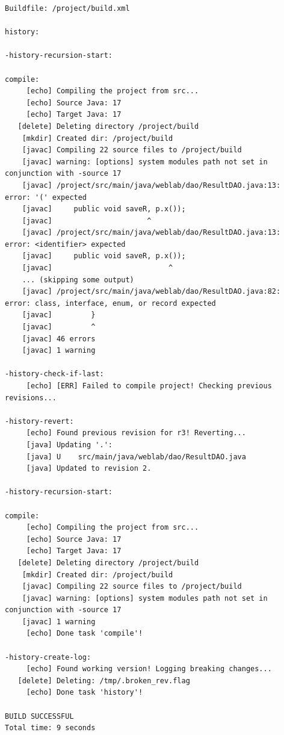 \begin{lstlisting}[caption={Лог цели \texttt{history} --- есть ошибки},language={},captionpos=b]
Buildfile: /project/build.xml

history:

-history-recursion-start:

compile:
     [echo] Compiling the project from src...
     [echo] Source Java: 17
     [echo] Target Java: 17
   [delete] Deleting directory /project/build
    [mkdir] Created dir: /project/build
    [javac] Compiling 22 source files to /project/build
    [javac] warning: [options] system modules path not set in conjunction with -source 17
    [javac] /project/src/main/java/weblab/dao/ResultDAO.java:13: error: '(' expected
    [javac]     public void saveR, p.x());
    [javac]                      ^
    [javac] /project/src/main/java/weblab/dao/ResultDAO.java:13: error: <identifier> expected
    [javac]     public void saveR, p.x());
    [javac]                           ^
    ... (skipping some output)
    [javac] /project/src/main/java/weblab/dao/ResultDAO.java:82: error: class, interface, enum, or record expected
    [javac]         }
    [javac]         ^
    [javac] 46 errors
    [javac] 1 warning

-history-check-if-last:
     [echo] [ERR] Failed to compile project! Checking previous revisions...

-history-revert:
     [echo] Found previous revision for r3! Reverting...
     [java] Updating '.':
     [java] U    src/main/java/weblab/dao/ResultDAO.java
     [java] Updated to revision 2.

-history-recursion-start:

compile:
     [echo] Compiling the project from src...
     [echo] Source Java: 17
     [echo] Target Java: 17
   [delete] Deleting directory /project/build
    [mkdir] Created dir: /project/build
    [javac] Compiling 22 source files to /project/build
    [javac] warning: [options] system modules path not set in conjunction with -source 17
    [javac] 1 warning
     [echo] Done task 'compile'!

-history-create-log:
     [echo] Found working version! Logging breaking changes...
   [delete] Deleting: /tmp/.broken_rev.flag
     [echo] Done task 'history'!

BUILD SUCCESSFUL
Total time: 9 seconds
\end{lstlisting}

